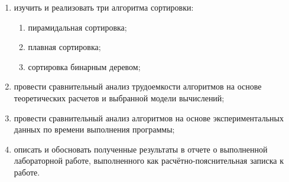 \begin{enumerate}[label=\arabic*)]
	\item изучить и реализовать три алгоритма сортировки:
	\begin{enumerate}
		\item пирамидальная сортировка; 
		\item плавная сортировка;
		\item сортировка бинарным деревом;
	\end{enumerate}
	\item провести сравнительный анализ трудоемкости алгоритмов на основе теоретических расчетов и выбранной модели вычислений;
	\item провести сравнительный анализ алгоритмов на основе экспериментальных данных по времени выполнения программы;
	\item описать и обосновать полученные результаты в отчете о выполненной лабораторной работе, выполненного как расчётно-пояснительная записка к работе.
\end{enumerate}
